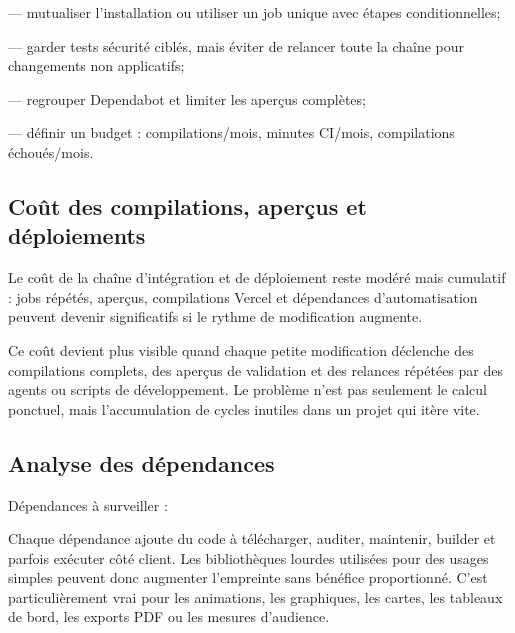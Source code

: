 \documentclass[
  10pt,
  a4paper,
  DIV=11,
  numbers=noendperiod,
  oneside]{scrreprt}
\begin{document}
--- mutualiser l'installation ou utiliser un job unique avec étapes
conditionnelles;

--- garder tests sécurité ciblés, mais éviter de relancer toute la
chaîne pour changements non applicatifs;

--- regrouper Dependabot et limiter les aperçus complètes;

--- définir un budget : compilations/mois, minutes CI/mois, compilations
échoués/mois.

\subsection{Coût des compilations, aperçus et
déploiements}\label{couxfbt-des-compilations-aperuxe7us-et-duxe9ploiements}

Le coût de la chaîne d'intégration et de déploiement reste modéré mais
cumulatif : jobs répétés, aperçus, compilations Vercel et dépendances
d'automatisation peuvent devenir significatifs si le rythme de
modification augmente.

Ce coût devient plus visible quand chaque petite modification déclenche
des compilations complets, des aperçus de validation et des relances
répétées par des agents ou scripts de développement. Le problème n'est
pas seulement le calcul ponctuel, mais l'accumulation de cycles inutiles
dans un projet qui itère vite.

\subsection{Analyse des dépendances}\label{analyse-des-duxe9pendances}

Dépendances à surveiller :

Chaque dépendance ajoute du code à télécharger, auditer, maintenir,
builder et parfois exécuter côté client. Les bibliothèques lourdes
utilisées pour des usages simples peuvent donc augmenter l'empreinte
sans bénéfice proportionné. C'est particulièrement vrai pour les
animations, les graphiques, les cartes, les tableaux de bord, les
exports PDF ou les mesures d'audience.
\end{document}

